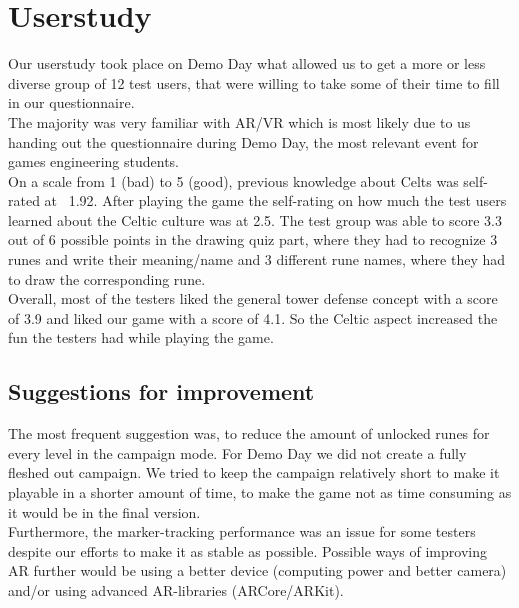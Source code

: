 \section{Userstudy}

Our userstudy took place on Demo Day what allowed us to get a more or less diverse group of 12 test users, that were willing to take some of their time to fill in our questionnaire. \\
The majority was very familiar with AR/VR which is most likely due to us handing out the questionnaire during Demo Day, the most relevant event for games engineering students. \\
On a scale from 1 (bad) to 5 (good), previous knowledge about Celts was self-rated at ~1.92. After playing the game the self-rating on how much the test users learned about the Celtic culture was at 2.5. The test group was able to score 3.3 out of 6 possible points in the drawing quiz part, where they had to recognize 3 runes and write their meaning/name and 3 different rune names, where they had to draw the corresponding rune. \\
Overall, most of the testers liked the general tower defense concept with a score of 3.9 and liked our game with a score of 4.1. So the Celtic aspect increased the fun the testers had while playing the game. \\

\subsection{Suggestions for improvement}

The most frequent suggestion was, to reduce the amount of unlocked runes for every level in the campaign mode. For Demo Day we did not create a fully fleshed out campaign. We tried to keep the campaign relatively short to make it playable in a shorter amount of time, to make the game not as time consuming as it would be in the final version. \\
Furthermore, the marker-tracking performance was an issue for some testers despite our efforts to make it as stable as possible. Possible ways of improving AR further would be using a better device (computing power and better camera) and/or using advanced AR-libraries (ARCore/ARKit).
